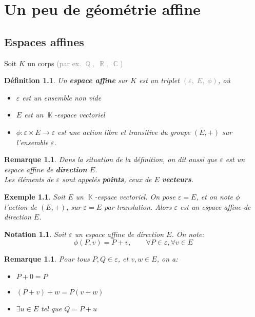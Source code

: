 \documentclass[a4paper, oneside]{report}
\theoremstyle{break}
\newtheorem{definition}[thm]{Définition}
\newtheorem{notation}[thm]{Notation}
\newtheorem{exemple}[thm]{Exemple}
\newtheorem{remarque}[thm]{Remarque}
\newcommand{\gray}[1]{\textcolor{gray}{#1}}
\DeclareMathOperator{\R}{\mathbb{R}}
\DeclareMathOperator{\K}{\mathbb{K}}
\DeclareMathOperator{\C}{\mathbb{C}}
\DeclareMathOperator{\Q}{\mathbb{Q}}
\newcommand{\slign}{\textbf}
\begin{document}
\chapter{Un peu de géométrie affine}

\section{Espaces affines}

Soit $K$ un corps \gray{(par ex. $\Q, \; \R, \; \C$)}

\begin{definition}
Un \slign{espace affine} sur $K$ est un triplet \gray{$(\varepsilon, \; E, \; \phi)$}, où
\begin{itemize}[label=$\bullet$]
\item $\varepsilon$ est un ensemble non vide

\item $E$ est un $\K$-espace vectoriel

\item $\phi : \varepsilon \times E \longrightarrow \varepsilon$ est une action libre et transitive du groupe $(E, +)$ sur l'ensemble $\varepsilon$.
\end{itemize}
\end{definition}

\begin{remarque}
Dans la situation de la définition, on dit aussi que $\varepsilon$ est un espace affine de \slign{direction} $E$.\\
Les éléments de $\varepsilon$ sont appelés \slign{points}, ceux de $E$ \slign{vecteurs}.
\end{remarque}

\begin{exemple}
Soit $E$ un $\K$-espace vectoriel. On pose $\varepsilon = E$, et on note $\phi$ l'action de $(E, +)$, sur $\varepsilon = E$ par translation. Alors $\varepsilon$ est un espace affine de direction $E$.
\end{exemple}

\begin{notation}
Soit $\varepsilon$ un espace affine de direction $E$. On note:
\[
\phi(P, v) = P + v,		\qquad	\forall P \in \varepsilon, \forall v \in E
\]
\end{notation}

\begin{remarque}
Pour tous $P, Q \in \varepsilon$, et $v,w \in E$, on a:
\begin{itemize}[label=$\bullet$]
\item $P + 0 = P$

\item $(P + v) + w = P (v + w)$

\item $\exists u \in E$ tel que $Q = P + u$
\end{itemize}
\end{remarque}
\end{document}

